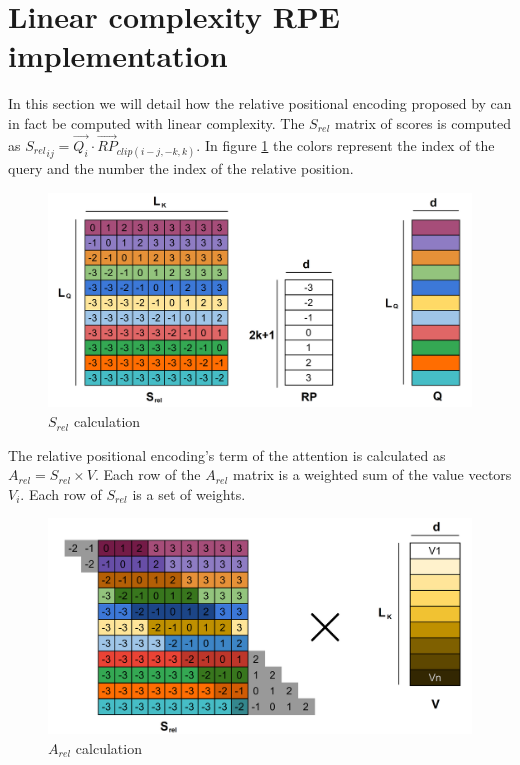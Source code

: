 \section{Linear complexity RPE
implementation}

In this section we will detail how the relative positional encoding
 proposed by \citet{shaw2018selfattention}
can in fact be computed with linear complexity. The $S_{rel}$ matrix of scores is computed as
${S_{rel}}_{ij} = \vec{Q_i} \cdotp \vec{RP}_{clip(i-j, -k, k)}$. In figure \ref{fig:S_rel} the colors represent the index of the query and the number the
index of the relative position.

\begin{figure}
\centering
\includegraphics[width=0.9\linewidth]{images/S_rel.png}
\caption{$S_{rel}$ calculation}
\label{fig:S_rel}
\end{figure}

The relative positional encoding's term of the attention is calculated as $A_{rel} = S_{rel} \times V$. Each row of the $A_{rel}$ matrix is a weighted sum of the value vectors $V_i$. Each row of $S_{rel}$ is a set of weights.

\begin{figure}
\centering
\includegraphics[width=0.9\linewidth]{images/S_rel_V.png}
\caption{$A_{rel}$ calculation}
\label{fig:A_rel_naive}
\end{figure}


